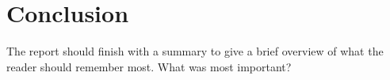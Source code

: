 \documentclass[conference,backref=page]{acmsiggraph}
\begin{document}
\section{Conclusion}
The report should finish with a summary to give a brief overview of what the reader should remember most.  What was most important?






\end{document}
